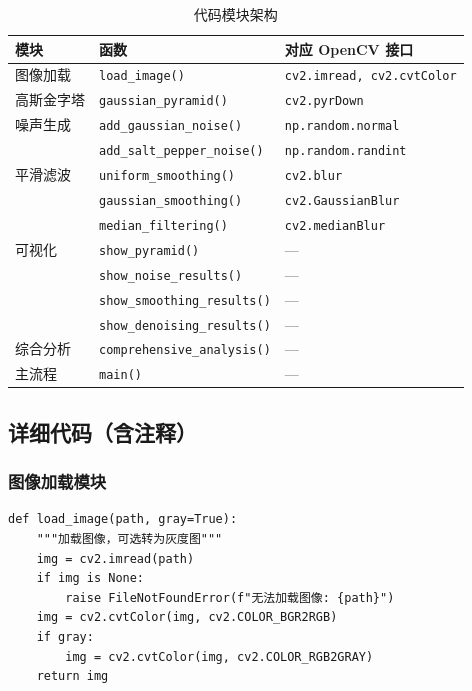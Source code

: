 \documentclass[12pt,a4paper]{ctexart}
\begin{document}
\begin{table}[H]
    \centering
    \caption{代码模块架构}
    \begin{tabular}{lll}
        \toprule
        \textbf{模块} & \textbf{函数} & \textbf{对应 OpenCV 接口} \\
        \midrule
        图像加载 & \texttt{load\_image()} & \texttt{cv2.imread, cv2.cvtColor} \\
        高斯金字塔 & \texttt{gaussian\_pyramid()} & \texttt{cv2.pyrDown} \\
        噪声生成 & \texttt{add\_gaussian\_noise()} & \texttt{np.random.normal} \\
                  & \texttt{add\_salt\_pepper\_noise()} & \texttt{np.random.randint} \\
        平滑滤波 & \texttt{uniform\_smoothing()} & \texttt{cv2.blur} \\
                  & \texttt{gaussian\_smoothing()} & \texttt{cv2.GaussianBlur} \\
                  & \texttt{median\_filtering()} & \texttt{cv2.medianBlur} \\
        可视化 & \texttt{show\_pyramid()} & --- \\
                  & \texttt{show\_noise\_results()} & --- \\
                  & \texttt{show\_smoothing\_results()} & --- \\
                  & \texttt{show\_denoising\_results()} & --- \\
        综合分析 & \texttt{comprehensive\_analysis()} & --- \\
        主流程 & \texttt{main()} & --- \\
        \bottomrule
    \end{tabular}
\end{table}

\subsection{详细代码（含注释）}

\subsubsection*{图像加载模块}

\begin{lstlisting}[caption={图像加载函数}, label=lst:load]
def load_image(path, gray=True):
    """加载图像，可选转为灰度图"""
    img = cv2.imread(path)
    if img is None:
        raise FileNotFoundError(f"无法加载图像: {path}")
    img = cv2.cvtColor(img, cv2.COLOR_BGR2RGB)
    if gray:
        img = cv2.cvtColor(img, cv2.COLOR_RGB2GRAY)
    return img
\end{lstlisting}
\end{document}
